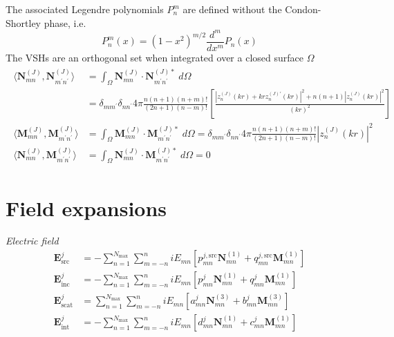\documentclass[11pt]{article}
\begin{document}
The associated Legendre polynomials $P_n^m$ are defined without the Condon-Shortley phase, i.e.
\begin{equation}
P_n^m(x) = (1 - x^2)^{m/2} \frac{d^m}{dx^m} P_n(x)
\end{equation}
The VSHs are an orthogonal set when integrated over a closed surface $\Omega$
\begin{align}
\begin{split}
    \langle \boldsymbol{N}_{mn}^{(J)}, \boldsymbol{N}_{m^\prime n^\prime}^{(J)} \rangle
    &= \int_\Omega \boldsymbol{N}_{mn}^{(J)} \cdot \boldsymbol{N}_{m^\prime n^\prime}^{(J)*} \;d\Omega \\
    &= \delta_{mm^\prime}\delta_{nn^\prime}4\pi \frac{n(n+1)(n+m)!}{(2n+1)(n-m)!}
      \left[ \frac{\left|z_n^{(J)}(kr) + krz_n^{(J)\prime}(kr)\right|^2 + n(n+1) \left|z_n^{(J)}(kr)\right|^2 }{(kr)^2} \right] \\
    \langle \boldsymbol{M}_{mn}^{(J)}, \boldsymbol{M}_{m^\prime n^\prime}^{(J)} \rangle
    &= \int_\Omega \boldsymbol{M}_{mn}^{(J)} \cdot \boldsymbol{M}_{m^\prime n^\prime}^{(J)*} \;d\Omega
    = \delta_{mm^\prime}\delta_{nn^\prime}4\pi \frac{n(n+1)(n+m)!}{(2n+1)(n-m)!} |z_n^{(J)}(kr)|^2 \\
    \langle \boldsymbol{N}_{mn}^{(J)}, \boldsymbol{M}_{m^\prime n^\prime}^{(J)} \rangle
    &= \int_\Omega \boldsymbol{N}_{mn}^{(J)} \cdot \boldsymbol{M}_{m^\prime n^\prime}^{(J)*} \;d\Omega = 0
\end{split}
\end{align}


\section{Field expansions}
\textit{Electric field}
\begin{subequations}
\begin{align}
    \boldsymbol{E}_\text{src}^j &= - \sum_{n=1}^{N_\text{max}} \sum_{m=-n}^{n}
    iE_{mn} \left[ p_{mn}^{j,\text{src}} \boldsymbol{N}_{mn}^{(1)} + q_{mn}^{j,\text{src}} \boldsymbol{M}_{mn}^{(1)} \right] \\
    \boldsymbol{E}_\text{inc}^j &= - \sum_{n=1}^{N_\text{max}} \sum_{m=-n}^{n}
    iE_{mn} \left[ p_{mn}^j \boldsymbol{N}_{mn}^{(1)} + q_{mn}^j \boldsymbol{M}_{mn}^{(1)} \right] \\
    \boldsymbol{E}_\text{scat}^j &= \sum_{n=1}^{N_\text{max}} \sum_{m=-n}^{n}
    iE_{mn} \left[a_{mn}^j \boldsymbol{N}_{mn}^{(3)} + b_{mn}^j \boldsymbol{M}_{mn}^{(3)} \right] \\
    \boldsymbol{E}_\text{int}^j &= - \sum_{n=1}^{N_\text{max}} \sum_{m=-n}^{n}
    iE_{mn} \left[ d_{mn}^j \boldsymbol{N}_{mn}^{(1)} + c_{mn}^j \boldsymbol{M}_{mn}^{(1)} \right]
\end{align}
\end{subequations}
\end{document}
